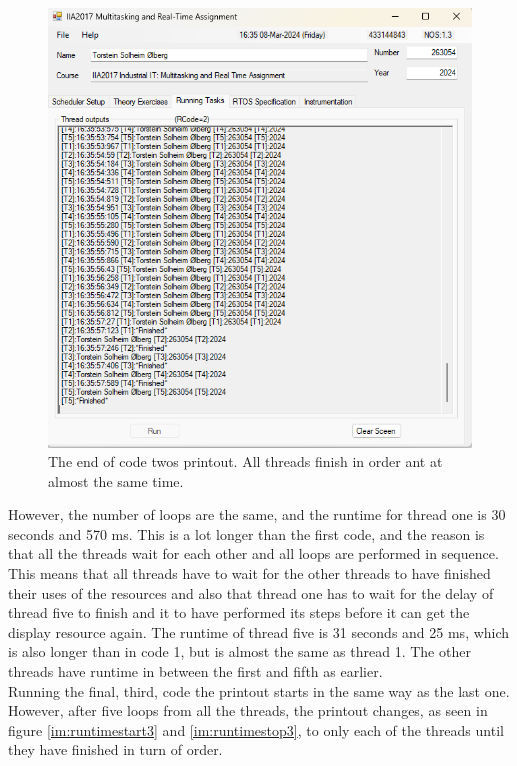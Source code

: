 \documentclass[12pt, A4paper, english]{book}
\begin{document}
				\begin{figure}
\includegraphics[width=\linewidth]{Runtime_stop2}
\caption{The end of code twos printout. All threads finish in order ant at almost the same time.}
\label{im:runtimestop2}
				\end{figure}
However, the number of loops are the same, and the runtime for thread one is 30 seconds and 570 ms. This is a lot longer than the first code, and the reason is that all the threads wait for each other and all loops are performed in sequence. This means that all threads have to wait for the other threads to have finished their uses of the resources and also that thread one has to wait for the delay of thread five to finish and it to have performed its steps before it can get the display resource again. The runtime of thread five is 31 seconds and 25 ms, which is also longer than in code 1, but is almost the same as thread 1. The other threads have runtime in between the first and fifth as earlier. \\
Running the final, third, code the printout starts in the same way as the last one. However, after five loops from all the threads, the printout changes, as seen in figure \ref{im:runtimestart3} and \ref{im:runtimestop3}, to only each of the threads until they have finished in turn of order. 
\end{document}

